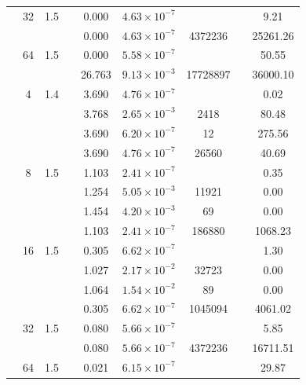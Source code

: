 \begin{table}[htbp]
\begin{tabular}{l S[table-format=3.0] S[table-format=4.1] l S[table-format=3.3] S[table-format=1.2e2] S[table-format=6.0] S[table-format=2.0] S[table-format=4.2]}
     & 32 & 1.5 &  & 0.000 & $4.63 \times 10^{-7}$ & {\text{---}} & {\text{---}} & 9.21 \\
     &  &  &  & 0.000 & $4.63 \times 10^{-7}$ & 4372236 & {\text{---}} & 25261.26 \\
     & 64 & 1.5 &  & 0.000 & $5.58 \times 10^{-7}$ & {\text{---}} & {\text{---}} & 50.55 \\
     &  &  &  & 26.763 & $9.13 \times 10^{-3}$ & 17728897 & {\text{---}} & 36000.10 \\
    \midrule
     & 4 & 1.4 &  & 3.690 & $4.76 \times 10^{-7}$ & {\text{---}} & {\text{---}} & 0.02 \\
     &  &  &  & 3.768 & $2.65 \times 10^{-3}$ & 2418 & {\text{---}} & 80.48 \\
     &  &  &  & 3.690 & $6.20 \times 10^{-7}$ & 12 & {\text{---}} & 275.56 \\
     &  &  &  & 3.690 & $4.76 \times 10^{-7}$ & 26560 & {\text{---}} & 40.69 \\
     & 8 & 1.5 &  & 1.103 & $2.41 \times 10^{-7}$ & {\text{---}} & {\text{---}} & 0.35 \\
     &  &  &  & 1.254 & $5.05 \times 10^{-3}$ & 11921 & {\text{---}} & 0.00 \\
     &  &  &  & 1.454 & $4.20 \times 10^{-3}$ & 69 & {\text{---}} & 0.00 \\
     &  &  &  & 1.103 & $2.41 \times 10^{-7}$ & 186880 & {\text{---}} & 1068.23 \\
     & 16 & 1.5 &  & 0.305 & $6.62 \times 10^{-7}$ & {\text{---}} & {\text{---}} & 1.30 \\
     &  &  &  & 1.027 & $2.17 \times 10^{-2}$ & 32723 & {\text{---}} & 0.00 \\
     &  &  &  & 1.064 & $1.54 \times 10^{-2}$ & 89 & {\text{---}} & 0.00 \\
     &  &  &  & 0.305 & $6.62 \times 10^{-7}$ & 1045094 & {\text{---}} & 4061.02 \\
     & 32 & 1.5 &  & 0.080 & $5.66 \times 10^{-7}$ & {\text{---}} & {\text{---}} & 5.85 \\
     &  &  &  & 0.080 & $5.66 \times 10^{-7}$ & 4372236 & {\text{---}} & 16711.51 \\
     & 64 & 1.5 &  & 0.021 & $6.15 \times 10^{-7}$ & {\text{---}} & {\text{---}} & 29.87 \\

\end{tabular}
\end{table}
